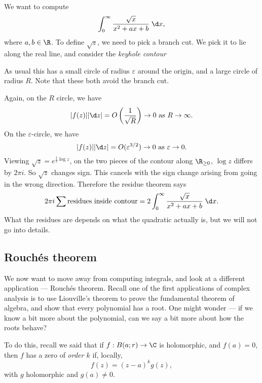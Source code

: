 \documentclass[a4paper]{article}
\begin{document}
\begin{eg}
  We want to compute
  \[
    \int_0^\infty \frac{\sqrt{x}}{x^2 + ax + b} \;\d x,
  \]
  where $a, b \in \R$. To define $\sqrt{z}$, we need to pick a branch cut. We pick it to lie along the real line, and consider the \emph{keyhole contour}
  \begin{center}
  \end{center}
  As usual this has a small circle of radius $\varepsilon$ around the origin, and a large circle of radius $R$. Note that these both avoid the branch cut.

  Again, on the $R$ circle, we have
  \[
    |f(z)||\d z| = O\left(\frac{1}{\sqrt{R}}\right) \to 0\text{ as }R \to \infty.
  \]
  On the $\varepsilon$-circle, we have
  \[
    |f(z)||\d z| = O(\varepsilon^{3/2}) \to 0\text{ as }\varepsilon \to 0.
  \]
  Viewing $\sqrt{z} = e^{\frac{1}{2}\log z}$, on the two pieces of the contour along $\R_{\geq 0}$, $\log z$ differs by $2 \pi i$. So $\sqrt{z}$ changes sign. This cancels with the sign change arising from going in the wrong direction. Therefore the residue theorem says
  \[
    2\pi i \sum \text{residues inside contour} = 2 \int_0^\infty \frac{\sqrt{x}}{x^2 + ax + b}\;\d x.
  \]
  What the residues are depends on what the quadratic actually is, but we will not go into details.
\end{eg}

\subsection{Rouch\'es theorem}
We now want to move away from computing integrals, and look at a different application --- Rouch\'es theorem. Recall one of the first applications of complex analysis is to use Liouville's theorem to prove the fundamental theorem of algebra, and show that every polynomial has a root. One might wonder --- if we know a bit more about the polynomial, can we say a bit more about how the roots behave?

To do this, recall we said that if $f: B(a; r) \to \C$ is holomorphic, and $f(a) = 0$, then $f$ has a zero of \emph{order $k$} if, locally,
\[
  f(z) = (z - a)^k g(z),
\]
with $g$ holomorphic and $g(a) \not= 0$.
\end{document}
